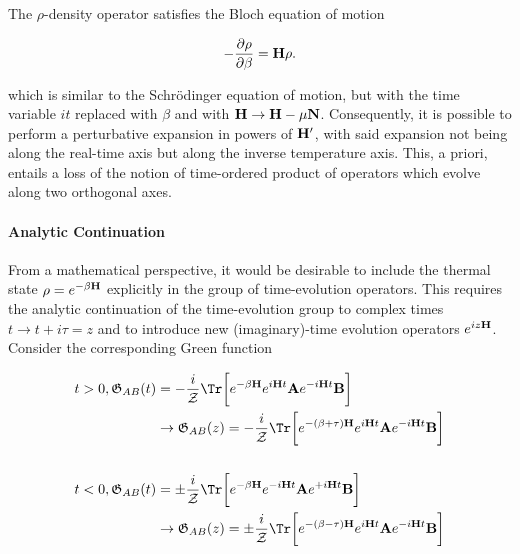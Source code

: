 The $\rho$-density operator satisfies the Bloch equation of motion 

\begin{equation}
    -\frac{\partial \rho}{\partial \beta} = {\bf H} \rho. 
\end{equation}

which is similar to the Schr\"odinger equation of motion, but with the time variable $it$ replaced with $\beta$ and with ${\bf H} \rightarrow {\bf H} - \mu {\bf N}$. Consequently, it is possible to perform a perturbative expansion in powers of ${\bf H}'$, with said expansion not being along the real-time axis but along the inverse temperature axis. This, a priori, entails a loss of the notion of time-ordered product of operators which evolve along two orthogonal axes. \\

\paragraph{Analytic Continuation}

From a mathematical perspective, it would be desirable to include the thermal state $\rho = e^{-\beta {\bf H}}$ explicitly in the group of time-evolution operators. This requires the analytic continuation of the time-evolution group to complex times $t \rightarrow t + i\tau = z$ and to introduce new (imaginary)-time evolution operators $e^{iz {\bf H}}$. Consider the corresponding Green function

\begin{equation}
    \begin{split}
        t>0, \mathfrak{G}_{AB}(t) &= - \frac{i}{\mathcal{Z}} \Tr \bigg[e^{-\beta {\bf H}} e^{i {\bf H} t} {\bf A} e^{-i {\bf H} t} {\bf B}\bigg] \\
        & \rightarrow \mathfrak{G}_{AB}(z) = - \frac{i}{\mathcal{Z}} \Tr \bigg[e^{-(\beta+\tau) {\bf H}} e^{i {\bf H} t} {\bf A} e^{-i {\bf H} t} {\bf B}\bigg] \\
        \\
        t<0, \mathfrak{G}_{AB}(t) &= \pm\frac{i}{\mathcal{Z}} \Tr \bigg[e^{-\beta {\bf H}} e^{-i {\bf H} t} {\bf A} e^{+i {\bf H} t} {\bf B}\bigg] \\
        & \rightarrow \mathfrak{G}_{AB}(z) = \pm \frac{i}{\mathcal{Z}} \Tr \bigg[e^{-(\beta-\tau) {\bf H}} e^{i {\bf H} t} {\bf A} e^{-i {\bf H} t} {\bf B}\bigg] \\
    \end{split}
\end{equation}

